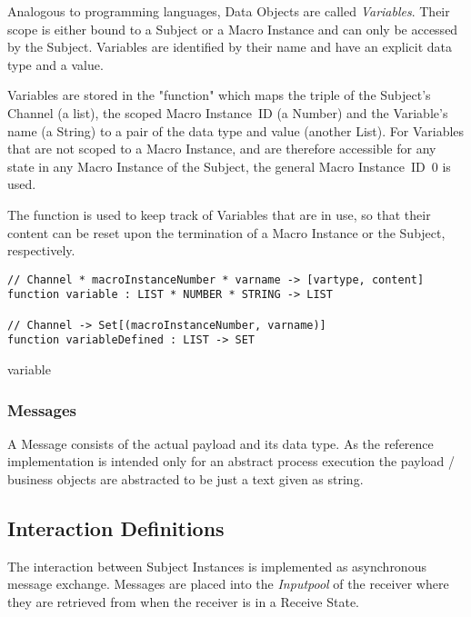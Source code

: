 
Analogous to programming languages, Data Objects are called \textit{Variables}. Their scope is either bound to a Subject or a Macro Instance and can only be accessed by the Subject. Variables are identified by their name and have an explicit data type and a value.

Variables are stored in the  "function" which maps the triple of the Subject's Channel (a list), the scoped Macro Instance~ID (a Number) and the Variable's name (a String) to a pair of the data type and value (another List). For Variables that are not scoped to a Macro Instance, and are therefore accessible for any state in any Macro Instance of the Subject, the general Macro Instance~ID~$0$ is used.

The function  is used to keep track of Variables that are in use, so that their content can be reset upon the termination of a Macro Instance or the Subject, respectively.

\begin{listing}[htbp]
\begin{verbatim}
// Channel * macroInstanceNumber * varname -> [vartype, content]
function variable : LIST * NUMBER * STRING -> LIST

// Channel -> Set[(macroInstanceNumber, varname)]
function variableDefined : LIST -> SET
\end{verbatim}
\caption{variable}
\label{lst:shortasm:variable}
\end{listing}


\subsubsection{Messages}\label{sec:messages}

A Message consists of the actual payload and its data type. As the reference implementation is intended only for an abstract process execution the payload / business objects are abstracted to be just a text given as string.

\subsection{Interaction Definitions}
\label{sec:InteractionDefinitions}

The interaction between Subject Instances is implemented as asynchronous message exchange. Messages are placed into the \textit{Inputpool} of the receiver where they are retrieved from when the receiver is in a Receive State.

